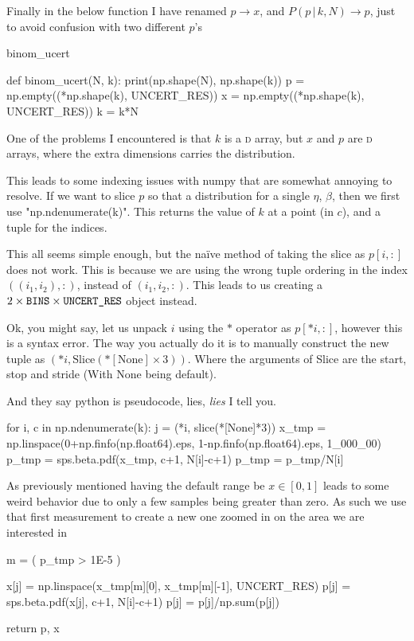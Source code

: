 \documentclass[10pt, a4paper]{article}
\newcommand{\nd}[1]{\oldstylenums{#1}\textsc{d}}
\begin{document}
Finally in the below function I have renamed $p \to x$, and $P(p \,|\, k, N ) \to p$, just to avoid confusion with two different $p$'s

\begin{codeblock}{binom_ucert}
\begin{code}
def binom_ucert(N, k):
	print(np.shape(N), np.shape(k))
	p = np.empty((*np.shape(k), UNCERT_RES))
	x = np.empty((*np.shape(k), UNCERT_RES))
	k = k*N
\end{code}

One of the problems I encountered is that $k$ is a \nd2 array, but $x$ and $p$ are \nd3 arrays, where the extra dimensions carries the distribution.

This leads to some indexing issues with numpy that are somewhat annoying to resolve. If we want to slice $p$ so that a distribution for a single $\eta$, $\beta$, then we first use "np.ndenumerate(k)". This returns the value of $k$ at a point (in $c$), and a tuple for the indices. 

This all seems simple enough, but the naïve method of taking the slice as $p[i, :]$ does not work. This is because we are using the wrong tuple ordering in the index $((i_1, i_2), :)$, instead of $(i_1, i_2, :)$. This leads to us creating a $2\times\text{\texttt{BINS}}\times\text{\texttt{UNCERT\_RES}}$ object instead. 

Ok, you might say, let us unpack $i$ using the $\ast$ operator as $p[\ast i, :]$, however this is a syntax error. The way you actually do it is to manually construct the new tuple as $(\ast i, \mathrm{Slice}(\ast[\mathrm{None}] \times 3))$. Where the  arguments of Slice are the start, stop and stride (With None being default).

{\tiny And they say python is pseudocode, lies, \emph{lies} I tell you. }

\begin{code}
	for i, c in np.ndenumerate(k):
		j = (*i, slice(*[None]*3))
		x_tmp = np.linspace(0+np.finfo(np.float64).eps,
		                    1-np.finfo(np.float64).eps,
		                    1_000_00)
		p_tmp = sps.beta.pdf(x_tmp, c+1, N[i]-c+1)
		p_tmp = p_tmp/N[i]
\end{code}

As previously mentioned having the default range be $x \in [0,1]$ leads to some weird behavior due to only a few samples being greater than zero. As such we use that first measurement to create a new one zoomed in on the area we are interested in

\begin{code}
		m = ( p_tmp > 1E-5 )
		
		x[j] = np.linspace(x_tmp[m][0], x_tmp[m][-1], UNCERT_RES)
		p[j] = sps.beta.pdf(x[j], c+1, N[i]-c+1)
		p[j] = p[j]/np.sum(p[j])
	
	return p, x
\end{code}
\end{codeblock}
\end{document}
